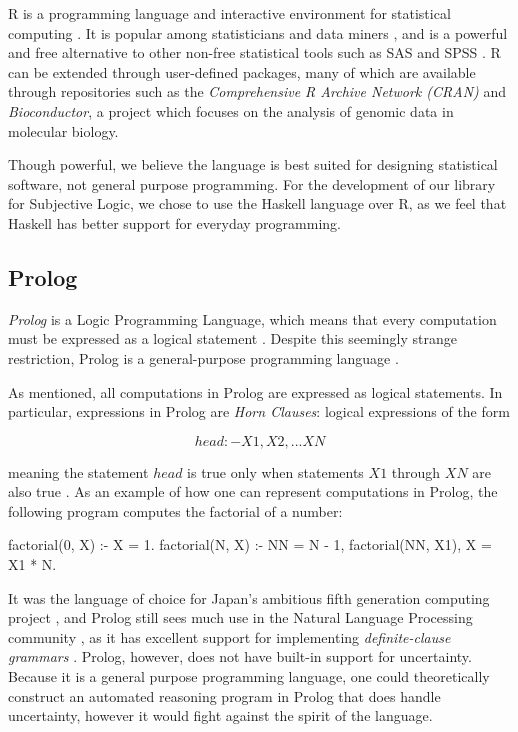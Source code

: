 \documentclass[thesis.tex]{subfiles}
\begin{document}
R is a programming language and interactive environment for statistical computing \cite{team2012r}.
It is popular among statisticians and data miners \cite{fox2005using, vance2009data}, and is a powerful
and free alternative to other non-free statistical tools
such as SAS \cite{delwiche2012little} and SPSS \cite{quintero2013workload}. R can be extended through
user-defined packages, many of which are available through repositories such as the \emph{Comprehensive R Archive Network (CRAN)}
and \emph{Bioconductor}, a project which focuses on the analysis of genomic data in molecular biology.

Though powerful, we believe the language is best suited for designing statistical software, not general purpose
programming. For the development of our library for Subjective Logic, we chose to use the Haskell
language over R, as we feel that Haskell has better support for everyday programming.





\subsection{Prolog}

\emph{Prolog} is a Logic Programming Language, which means that every computation must be
expressed as a logical statement \cite{sterling1994art}. Despite this seemingly strange restriction, Prolog is
a general-purpose programming language \cite{sterling1994art}.

As mentioned, all computations in Prolog are expressed as logical statements. In particular,
expressions in Prolog are \emph{Horn Clauses}: logical expressions of the form

$$
head :- X1, X2, ... XN
$$

meaning the statement $head$ is true only when statements $X1$ through $XN$ are also true \cite{horn1951sentences}.
As an example of how one can represent computations in Prolog, the following program computes
the factorial of a number:

\begin{code}
factorial(0, X) :- X = 1.
factorial(N, X) :- NN = N - 1, factorial(NN, X1), X = X1 * N.
\end{code}

It was the language of choice for Japan's ambitious fifth generation computing project \cite{shapiro1983fifth},
and Prolog still sees much use in the Natural Language Processing community
\cite{covington1994natural, pelletier2006representation},
as it has excellent support for implementing \emph{definite-clause grammars} \cite{pereira1980definite}.
Prolog, however, does not have built-in support for uncertainty. Because it is a general purpose
programming language, one could theoretically construct an automated reasoning program in Prolog that
does handle uncertainty, however it would fight against the spirit of the language.
\end{document}
